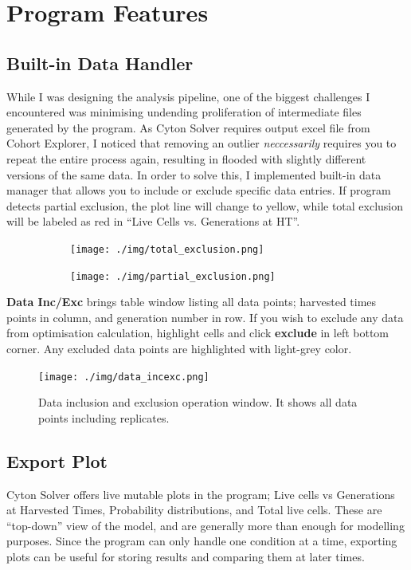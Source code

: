 \documentclass{article}
\newcommand{\enterProblemHeader}[1]{
    }
\newcommand{\exitProblemHeader}[1]{
    }
\newcounter{homeworkProblemCounter} %
\newcommand{\homeworkProblemName}{}
\newenvironment{homeworkProblem}[1][Problem \arabic{homeworkProblemCounter}]{ %
    \stepcounter{homeworkProblemCounter} %
    \renewcommand{\homeworkProblemName}{#1} %
    \section{\homeworkProblemName} %
    \enterProblemHeader{\homeworkProblemName} %
    }{
    \exitProblemHeader{\homeworkProblemName} %
    }
\begin{document}
\begin{homeworkProblem}[Program Features]
        \subsection{Built-in Data Handler}
        While I was designing the analysis pipeline, one of the biggest challenges I encountered was minimising undending proliferation of intermediate files generated by the program. As Cyton Solver requires output excel file from Cohort Explorer, I noticed that removing an outlier \textit{neccessarily} requires you to repeat the entire process again, resulting in flooded with slightly different versions of the same data. In order to solve this, I implemented built-in data manager that allows you to include or exclude specific data entries. If program detects partial exclusion, the plot line will change to yellow, while total exclusion will be labeled as red in ``Live Cells vs. Generations at HT''.
        
        \begin{figure}[h]
            \begin{subfigure}{.5\textwidth}
                \texttt{[image: ./img/total\_exclusion.png]}
            \end{subfigure}
            \begin{subfigure}{.5\textwidth}
                \texttt{[image: ./img/partial\_exclusion.png]}
            \end{subfigure}
        \end{figure}

        \textbf{Data Inc/Exc} brings table window listing all data points; harvested times points in column, and generation number in row. If you wish to exclude any data from optimisation calculation, highlight cells and click \textbf{exclude} in left bottom corner. Any excluded data points are highlighted with light-grey color.
        \begin{figure}[h]
            \centering
            \texttt{[image: ./img/data\_incexc.png]}
            \caption{Data inclusion and exclusion operation window. It shows all data points including replicates.}
            \label{fig:data_incexc}
        \end{figure}

        \subsection{Export Plot}        
        Cyton Solver offers live mutable plots in the program; Live cells vs Generations at Harvested Times, Probability distributions, and Total live cells. These are ``top-down'' view of the model, and are generally more than enough for modelling purposes. Since the program can only handle one condition at a time, exporting plots can be useful for storing results and comparing them at later times. 
        

\end{homeworkProblem}
\end{document}
